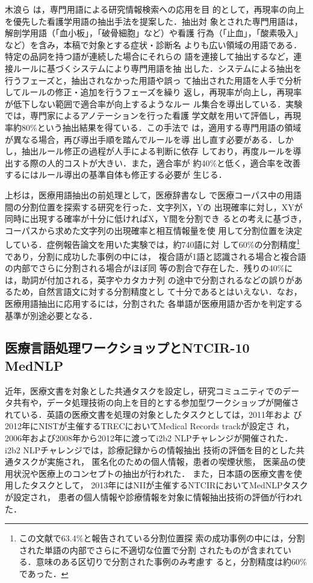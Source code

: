 \documentclass[japanese]{jnlp_1.4}
\begin{document}
木浪ら\cite{kinami2008kango} は，専門用語による研究情報検索への応用を目
的として，再現率の向上を優先した看護学用語の抽出手法を提案した．抽出対
象とされた専門用語は，解剖学用語（「血小板」，「破骨細胞」など）や看護
行為（「止血」，「酸素吸入」など）を含み，本稿で対象とする症状・診断名
よりも広い領域の用語である．特定の品詞を持つ語が連続した場合にそれらの
語を連接して抽出するなど，連接ルールに基づくシステムにより専門用語を抽
出した．システムによる抽出を行うフェーズと，抽出されなかった用語や誤っ
て抽出された用語を人手で分析してルールの修正・追加を行うフェーズを繰り
返し，再現率が向上し，再現率が低下しない範囲で適合率が向上するようなルー
ル集合を導出している．実験では，専門家によるアノテーションを行った看護
学文献を用いて評価し，再現率約80\%という抽出結果を得ている．この手法で
は，適用する専門用語の領域が異なる場合，再び導出手順を踏んでルールを導
出し直す必要がある．しかし，抽出ルール修正の過程が人手による判断に依存
しており，再度ルールを導出する際の人的コストが大きい．また，適合率が
約40\%と低く，適合率を改善するにはルール導出の基準自体も修正する必要が
生じる．

上杉\cite{uesugi2007n-gram}は，医療用語抽出の前処理として，医療辞書なし
で医療コーパス中の用語間の分割位置を探索する研究を行った．文字列X，Yの
出現確率に対し，XYが同時に出現する確率が十分に低ければX，Y間を分割でき
るとの考えに基づき，コーパスから求めた文字列の出現確率と相互情報量を使
用して分割位置を決定している．症例報告論文を用いた実験では，約740語に対
して60\%の分割精度\footnote{この文献で63.4\%と報告されている分割位置探
  索の成功事例の中には，分割された単語の内部でさらに不適切な位置で分割
  されたものが含まれている．意味のある区切りで分割された事例のみ考慮す
  ると，分割精度は約60\%であった．}であり，分割に成功した事例の中には，
複合語が1語と認識される場合と複合語の内部でさらに分割される場合がほぼ同
等の割合で存在した．残りの40\%には，助詞が付加される，英字やカタカナ列
の途中で分割されるなどの誤りがあるため，自然言語文に対する分割精度とし
て十分であるとはいえない．なお，医療用語抽出に応用するには，分割された
各単語が医療用語か否かを判定する基準が別途必要となる．


\subsection{医療言語処理ワークショップとNTCIR-10 MedNLP}

近年，医療文書を対象とした共通タスクを設定し，研究コミュニティでのデー
タ共有や，データ処理技術の向上を目的とする参加型ワークショップが開催さ
れている．英語の医療文書を処理の対象としたタスクとしては，2011年およ
び2012年にNISTが主催するTRECにおいてMedical Records trackが設定さ
れ，2006年および2008年から2012年に渡ってi2b2 NLPチャレンジが開催された．
i2b2 NLPチャレンジでは，診療記録からの情報抽出
技術の評価を目的とした共通タスクが実施され，
匿名化のための個人情報\cite{uzuner2007evaluating}，患者の喫煙状態\cite{uzuner2008identifying}，
医薬品の使用状況\cite{uzuner2010extracting}や医療上のコンセプト\cite{uzuner20112010}の抽出が行われた．
また，日本語の医療文書を使用したタスクとして，
2013年にはNIIが主催するNTCIRにおいてMedNLPタスク\cite{morita2013overview}が設定され，
患者の個人情報や診療情報を対象に情報抽出技術の評価が行われた．
\end{document}
